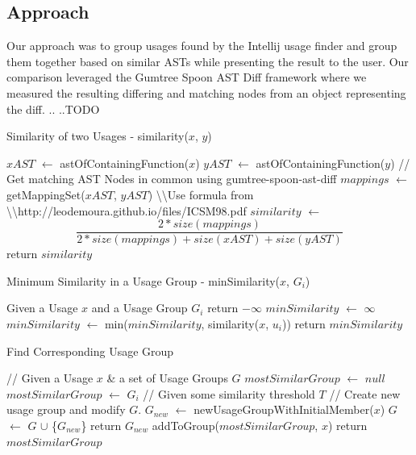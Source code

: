 \documentclass[conference]{IEEEtran}
\begin{document}
\subsection{Approach}
Our approach was to group usages found by the Intellij usage finder and group them together based on similar ASTs while presenting the result to the user. Our comparison leveraged the Gumtree Spoon AST Diff framework where we measured the resulting differing and matching nodes from an object representing the diff. 
 .. ..TODO 


\begin{algorithm}
	\caption{Similarity of two Usages - similarity($x$, $y$)} 
	\begin{algorithmic}[1]
	\State $xAST$  $\leftarrow$ astOfContainingFunction($x$)
	\State $yAST$ $\leftarrow$ astOfContainingFunction($y$)
	\State // Get matching AST Nodes in common using gumtree-spoon-ast-diff
	\State $mappings$ $\leftarrow$ getMappingSet($xAST$, $yAST$)
	\State 
	\textbackslash \textbackslash  Use formula from 	
	\State 
	\textbackslash \textbackslash http://leodemoura.github.io/files/ICSM98.pdf
	\State $similarity$ $\leftarrow$
	$$\frac
	{2*size(mappings)}
	{2*size(mappings) + size(xAST) + size(yAST)}$$
	\State return $similarity$
	\end{algorithmic} 
\end{algorithm}
\begin{algorithm}
	\caption{Minimum Similarity in a Usage Group - minSimilarity($x$, $G_{i}$)} 
	\begin{algorithmic}[1]
	\State Given a Usage $x$ and a Usage Group $G_{i}$
	\State return  $-\infty$
	\EndIf
	\State $minSimilarity$ $\leftarrow$ $\infty$
	\State $minSimilarity$ $\leftarrow$ min($minSimilarity$, similarity($x$, $u_{i}$))
	\EndFor
	\State return $minSimilarity$
	\end{algorithmic} 
\end{algorithm}


\begin{algorithm}
	\caption{Find Corresponding Usage Group} 
	\begin{algorithmic}[1]
	\State // Given a Usage $x$ \& a set of Usage Groups $G$
	\State $mostSimilarGroup$ $\leftarrow$ $null$
    \State $mostSimilarGroup$ $\leftarrow$ $G_{i}$
    \EndIf
	\EndFor
	\State // Given some similarity threshold $T$
	    \State // Create new usage group and modify $G$.
	    \State $G_{new}$ $\leftarrow$ newUsageGroupWithInitialMember($x$)
	    \State $G$ $\leftarrow$ $G$ $\cup$ \{$G_{new}$\}
	    \State return $G_{new}$
	\EndIf
	\State addToGroup($mostSimilarGroup$, $x$)
	\State return $mostSimilarGroup$
	\end{algorithmic} 
\end{algorithm}
\end{document}
